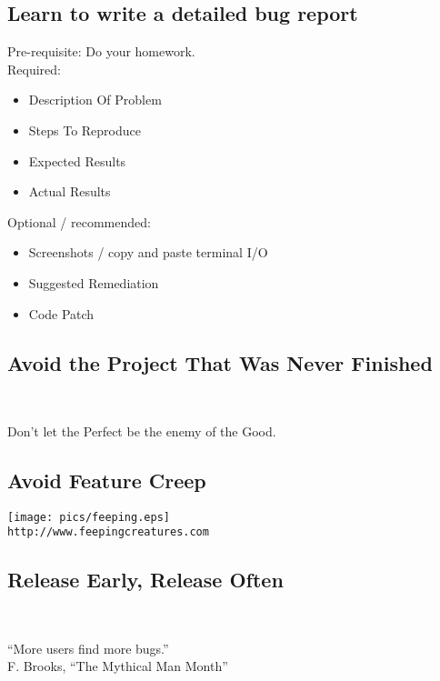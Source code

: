 \documentclass[xga]{xdvislides}
\begin{document}
\subsection{Learn to write a detailed bug report}
Pre-requisite: Do your homework. \\

Required:
\begin{itemize}
	\item Description Of Problem
	\item Steps To Reproduce
	\item Expected Results
	\item Actual Results
\end{itemize}
\vspace{.125in}

Optional / recommended:
\begin{itemize}
	\item Screenshots / copy and paste terminal I/O
	\item Suggested Remediation
	\item Code Patch
\end{itemize}

\subsection{Avoid the Project That Was Never Finished}
\\
\Huge
\begin{center}
	Don't let the Perfect be the enemy of the Good.
\end{center}
\Normalsize

\subsection{Avoid Feature Creep}
\vspace*{\fill}
\begin{center}
	\texttt{[image: pics/feeping.eps]} \\
	\small
	\verb+http://www.feepingcreatures.com+
\end{center}
\vspace*{\fill}

\subsection{Release Early, Release Often}
\\
\Huge
\begin{center}
	``More users find more bugs.'' \\
	\addvspace{.2in}
	\small F. Brooks, ``The Mythical Man Month''
\end{center}
\Normalsize
\end{document}
